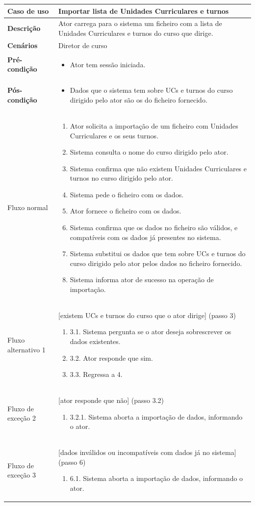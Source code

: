 \documentclass[12pt, a4paper]{article}
\newenvironment{condition}{
    \begin{itemize}[wide=0pt]
        \vspace{-0.2cm}
}{
        \vspace{-0.5cm}
    \end{itemize}
}
\newcommand\flow[1]{
    Fluxo normal &
    \singlespacing
    \begin{enumerate}[wide=0pt]
        #1
        \vspace{-0.3cm}
    \end{enumerate} \\ \hline
}
\newcommand\otherflow[3]{
    #1 &
    #2
    \singlespacing
    \begin{enumerate}[wide=0pt]
        #3
        \vspace{-0.3cm}
    \end{enumerate} \\ \hline
}
\newenvironment{usecase}[5]{
    \begin{table}[H]
        \centering
        \begin{tabular}{|>{\centering\arraybackslash\bf}m{3cm}|m{13cm}|}
            \hline
            Caso de uso & \textbf{#1} \\

            \hline
            Descrição & #2 \\

            \hline
            Cenários & #3 \\

            \hline
            Pré-condição &
            \begin{condition}
                #4
            \end{condition} \\

            \hline
            Pós-condição &
            \begin{condition}
                #5
            \end{condition} \\

            \hline
}{
    \end{tabular}
\end{table}
}
\begin{document}
\begin{usecase}
    {Importar lista de Unidades Curriculares e turnos}
    {
        Ator carrega para o sistema um ficheiro com a lista de Unidades Curriculares e turnos do
        curso que dirige.
    }
    {Diretor de curso}
    {\item Ator tem sessão iniciada.}
    {
        \item Dados que o sistema tem sobre UCs e turnos do curso dirigido pelo ator são os do
            ficheiro fornecido.
    }

    \flow{
        \item Ator solicita a importação de um ficheiro com Unidades Curriculares e os seus turnos.
        \item Sistema consulta o nome do curso dirigido pelo ator.
        \item Sistema confirma que não existem Unidades Curriculares e turnos no curso dirigido pelo
            ator.
        \item Sistema pede o ficheiro com os dados.
        \item Ator fornece o ficheiro com os dados.
        \item Sistema confirma que os dados no ficheiro são válidos, e compatíveis com os dados já
            presentes no sistema.
        \item Sistema substitui os dados que tem sobre UCs e turnos do curso dirigido pelo ator
            pelos dados no ficheiro fornecido.
        \item Sistema informa ator de sucesso na operação de importação.
    }

    \otherflow{Fluxo alternativo 1}{[existem UCs e turnos do curso que o ator dirige] (passo 3)}{
        \item[3.1.] Sistema pergunta se o ator deseja sobrescrever os dados existentes.
        \item[3.2.] Ator responde que sim.
        \item[3.3.] Regressa a 4.
    }

    \otherflow{Fluxo de exceção 2}{[ator responde que não] (passo 3.2)}{
        \item[3.2.1.] Sistema aborta a importação de dados, informando o ator.
    }

    \otherflow{Fluxo de exceção 3}
        {[dados inválidos ou incompatíveis com dados já no sistema] (passo 6)}{

        \item[6.1.] Sistema aborta a importação de dados, informando o ator.
    }
\end{usecase}
\end{document}
